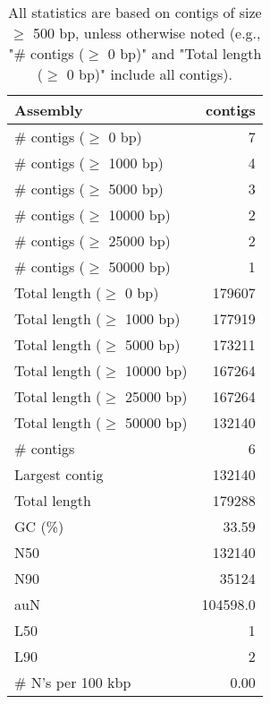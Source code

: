 \documentclass[12pt,a4paper]{article}
\begin{document}
\begin{table}[ht]
\begin{center}
\caption{All statistics are based on contigs of size $\geq$ 500 bp, unless otherwise noted (e.g., "\# contigs ($\geq$ 0 bp)" and "Total length ($\geq$ 0 bp)" include all contigs).}
\begin{tabular}{|l*{1}{|r}|}
\hline
Assembly & contigs \\ \hline
\# contigs ($\geq$ 0 bp) & 7 \\ \hline
\# contigs ($\geq$ 1000 bp) & 4 \\ \hline
\# contigs ($\geq$ 5000 bp) & 3 \\ \hline
\# contigs ($\geq$ 10000 bp) & 2 \\ \hline
\# contigs ($\geq$ 25000 bp) & 2 \\ \hline
\# contigs ($\geq$ 50000 bp) & 1 \\ \hline
Total length ($\geq$ 0 bp) & 179607 \\ \hline
Total length ($\geq$ 1000 bp) & 177919 \\ \hline
Total length ($\geq$ 5000 bp) & 173211 \\ \hline
Total length ($\geq$ 10000 bp) & 167264 \\ \hline
Total length ($\geq$ 25000 bp) & 167264 \\ \hline
Total length ($\geq$ 50000 bp) & 132140 \\ \hline
\# contigs & 6 \\ \hline
Largest contig & 132140 \\ \hline
Total length & 179288 \\ \hline
GC (\%) & 33.59 \\ \hline
N50 & 132140 \\ \hline
N90 & 35124 \\ \hline
auN & 104598.0 \\ \hline
L50 & 1 \\ \hline
L90 & 2 \\ \hline
\# N's per 100 kbp & 0.00 \\ \hline
\end{tabular}
\end{center}
\end{table}
\end{document}
